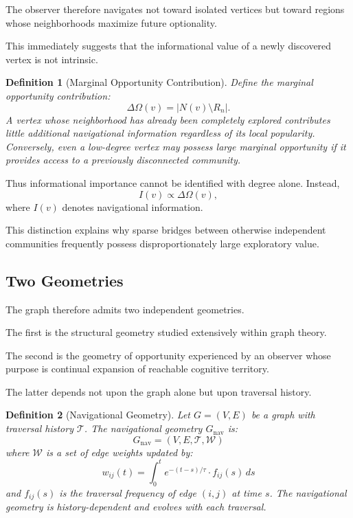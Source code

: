 \documentclass[12pt,oneside]{article}
\newtheorem{definition}{Definition}[section]
\theoremstyle{remark}
\begin{document}
The observer therefore navigates not toward isolated vertices but toward regions whose neighborhoods maximize future optionality.

This immediately suggests that the informational value of a newly discovered vertex is not intrinsic.

\begin{definition}[Marginal Opportunity Contribution]
Define the marginal opportunity contribution:
\[
\Delta\Omega(v) = |N(v) \setminus R_n|.
\]
A vertex whose neighborhood has already been completely explored contributes little additional navigational information regardless of its local popularity. Conversely, even a low-degree vertex may possess large marginal opportunity if it provides access to a previously disconnected community.
\end{definition}

Thus informational importance cannot be identified with degree alone. Instead,
\[
I(v) \propto \Delta\Omega(v),
\]
where \(I(v)\) denotes navigational information.

This distinction explains why sparse bridges between otherwise independent communities frequently possess disproportionately large exploratory value.

\subsection{Two Geometries}

The graph therefore admits two independent geometries.

The first is the structural geometry studied extensively within graph theory.

The second is the geometry of opportunity experienced by an observer whose purpose is continual expansion of reachable cognitive territory.

The latter depends not upon the graph alone but upon traversal history.

\begin{definition}[Navigational Geometry]
Let \(G = (V,E)\) be a graph with traversal history \(\mathcal{T}\). The navigational geometry \(G_{\text{nav}}\) is:
\[
G_{\text{nav}} = (V, E, \mathcal{T}, \mathcal{W})
\]
where \(\mathcal{W}\) is a set of edge weights updated by:
\[
w_{ij}(t) = \int_{0}^{t} e^{-(t-s)/\tau} \cdot f_{ij}(s) \, ds
\]
and \(f_{ij}(s)\) is the traversal frequency of edge \((i,j)\) at time \(s\). The navigational geometry is history-dependent and evolves with each traversal.
\end{definition}
\end{document}
